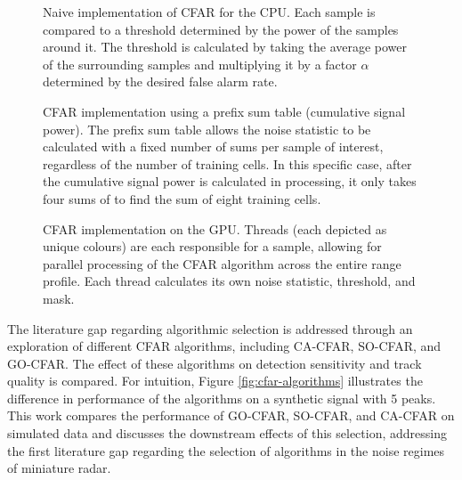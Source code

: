 \begin{figure}[!ht]
    \caption[Naive CPU CFAR implementation.]{Naive implementation of CFAR for the CPU. Each sample is compared to a threshold
    determined by the power of the samples around it. The threshold is calculated by taking the
    average power of the surrounding samples and multiplying it by a factor \(\alpha\) determined
    by the desired false alarm rate.}
    \label{fig:naive-cfar}
\end{figure}

\begin{figure}[htbp]
    \label{fig:prefix-sum-table}
    \caption[CFAR using a prefix sum table for constant-time noise statistics.]{CFAR implementation using a prefix sum table (cumulative signal power). The prefix sum
    table allows the noise statistic to be calculated with a fixed number of sums per sample of
    interest, regardless of the number of training cells. In this specific case, after the cumulative
    signal power is calculated in processing, it only takes four sums of to find the sum of eight
    training cells.}
\end{figure}

\begin{figure}[htbp]
    \label{fig:gpu-cfar}
    \caption[Parallel GPU CFAR implementation.]{CFAR implementation on the GPU. Threads (each depicted as unique colours) are each
    responsible for a sample, allowing for parallel processing of the CFAR algorithm across the entire
    range profile. Each thread calculates its own noise statistic, threshold, and mask.}
\end{figure}

The literature gap regarding algorithmic selection is addressed through an exploration of different CFAR
algorithms, including CA-CFAR, SO-CFAR, and GO-CFAR. The effect of these algorithms on detection
sensitivity and track quality is compared. For intuition, Figure \ref{fig:cfar-algorithms} illustrates
the difference in performance of the algorithms on a synthetic signal with 5 peaks. This work 
compares the performance of GO-CFAR, SO-CFAR, and CA-CFAR on simulated data and discusses
the downstream effects of this selection, addressing the first literature gap regarding the selection of 
algorithms in the noise regimes of miniature radar.  


